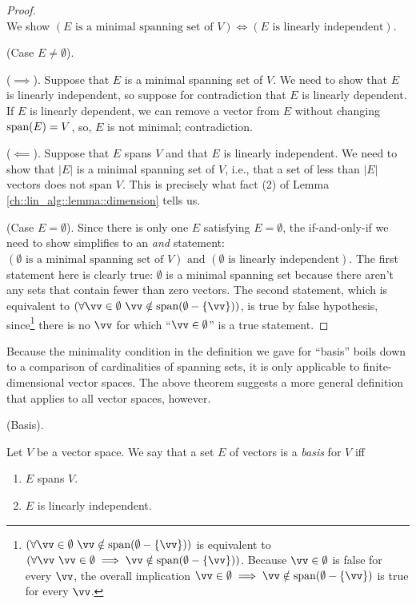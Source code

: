 \begin{proof}
    \mbox{} \\ \indent
    We show $(\text{$E$ is a minimal spanning set of $V$}) \iff (\text{$E$ is linearly independent})$.
    
    (Case $E \neq \emptyset$).
    
    \indent ($\implies$). Suppose that $E$ is a minimal spanning set of $V$. We need to show that $E$ is linearly independent, so suppose for contradiction that $E$ is linearly dependent. If $E$ is linearly dependent, we can remove a vector from $E$ without changing $\text{span}(E) = V$, so, $E$ is not minimal; contradiction.
    
    \indent ($\impliedby$). Suppose that $E$ spans $V$ and that $E$ is linearly independent. We need to show that $|E|$ is a minimal spanning set of $V$, i.e., that a set of less than $|E|$ vectors does not span $V$. This is precisely what fact (2) of Lemma \ref{ch::lin_alg::lemma::dimension} tells us.
    
    (Case $E = \emptyset$). Since there is only one $E$ satisfying $E = \emptyset$, the if-and-only-if we need to show simplifies to an \textit{and} statement: $(\text{$\emptyset$ is a minimal spanning set of $V$}) \text{ and } (\text{$\emptyset$ is linearly independent})$. The first statement here is clearly true: $\emptyset$ is a minimal spanning set because there aren't any sets that contain fewer than zero vectors. The second statement, which is equivalent to $(\forall \vv \in \emptyset \spc \vv \notin \spann(\emptyset - \{\vv\}))$, is true by false hypothesis, since\footnote{$(\forall \vv \in \emptyset \spc \vv \notin \spann(\emptyset - \{\vv\}))$ is equivalent to $(\forall \vv \spc \vv \in \emptyset \implies \vv \notin \spann(\emptyset - \{\vv\}))$. Because $\vv \in \emptyset$ is false for every $\vv$, the overall implication $\vv \in \emptyset \implies \vv \notin \spann(\emptyset - \{\vv\})$ is true for every $\vv$.} there is no $\vv$ for which ``$\vv \in \emptyset$'' is a true statement.
    
    
\end{proof}

Because the minimality condition in the definition we gave for ``basis'' boils down to a comparison of cardinalities of spanning sets, it is only applicable to finite-dimensional vector spaces. The above theorem suggests a more general definition that applies to all vector spaces, however.

\begin{defn}
    (Basis).
    
    Let $V$ be a vector space. We say that a set $E$ of vectors is a \textit{basis} for $V$ iff
   
   \begin{enumerate}
        \item $E$ spans $V$.
        \item $E$ is linearly independent.
    \end{enumerate}
\end{defn}


